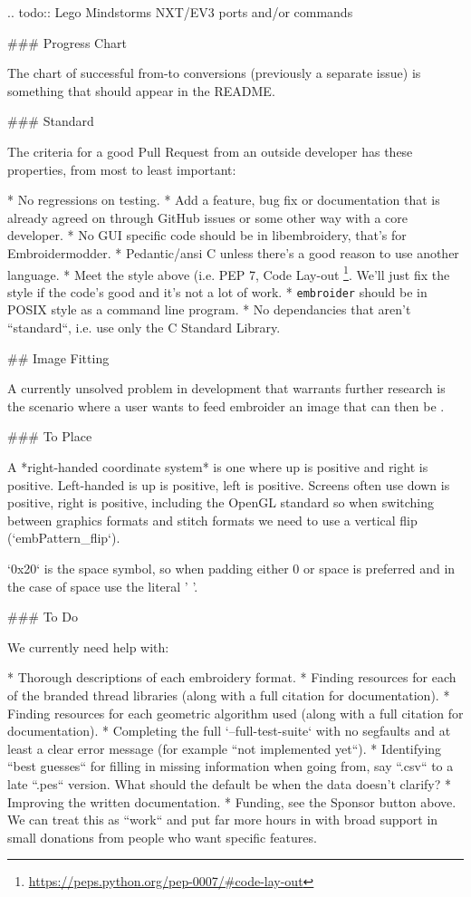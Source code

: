 .. todo::
   Lego Mindstorms NXT/EV3 ports and/or commands

### Progress Chart

The chart of successful from-to conversions (previously a separate issue)
is something that should appear in the README.

### Standard

The criteria for a good Pull Request from an outside developer has these properties, from most to least important:

* No regressions on testing.
* Add a feature, bug fix or documentation that is already agreed on through GitHub issues or some other way with a core developer.
* No GUI specific code should be in libembroidery, that's for Embroidermodder.
* Pedantic/ansi C unless there's a good reason to use another language.
* Meet the style above (i.e.  PEP 7, Code Lay-out \footnote{\url{https://peps.python.org/pep-0007/#code-lay-out}}. We'll just fix the style if the code's good and it's not a lot of work.
* \texttt{embroider} should be in POSIX style as a command line program.
* No dependancies that aren't ``standard``, i.e. use only the C Standard Library.

## Image Fitting

A currently unsolved problem in development that warrants further research is
the scenario where a user wants to feed embroider an image that can then be .

### To Place

A *right-handed coordinate system* 
is one where up is positive and right is
positive. Left-handed is up is positive, left is positive. Screens often use
down is positive, right is positive, including the OpenGL standard so when
switching between graphics formats and stitch formats we need to use a vertical
flip (`embPattern\_flip`).

`0x20` is the space symbol, so when padding either 0 or space is preferred and
in the case of space use the literal ' '.

### To Do

We currently need help with:

* Thorough descriptions of each embroidery format.
* Finding resources for each of the branded thread libraries (along with a full citation for documentation).
* Finding resources for each geometric algorithm used (along with a full citation for documentation).
* Completing the full `--full-test-suite` with no segfaults and at least a clear error message (for example ``not implemented yet``).
* Identifying ``best guesses`` for filling in missing information when going from, say ``.csv`` to a late ``.pes`` version. What should the default be when the data doesn't clarify?
* Improving the written documentation.
* Funding, see the Sponsor button above. We can treat this as ``work`` and put far more hours in with broad support in small donations from people who want specific features.


